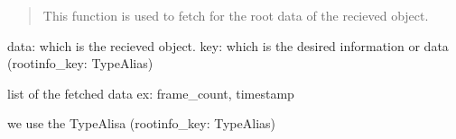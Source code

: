 \documentclass[letterpaper,10pt,english]{sphinxmanual}
\begin{document}

\begin{fulllineitems}
\label{\detokenize{utilities:utilities.utilities.get_root_info}}
\pysigstartsignatures
{}
\pysigstopsignatures\begin{description}
\begin{quote}

\sphinxAtStartPar
This function is used to fetch for the root data of the recieved object.
\end{quote}
\begin{description}
\sphinxAtStartPar
data: which is the recieved object.
key: which is the desired information or data (rootinfo\_key: TypeAlias)

\sphinxAtStartPar
list of the fetched data ex: frame\_count, timestamp

\end{description}

\end{description}

\sphinxAtStartPar
we use the TypeAlisa (rootinfo\_key: TypeAlias)

\end{fulllineitems}

\end{document}
